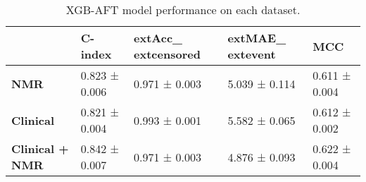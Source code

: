 \begin{table}
\caption{XGB-AFT model performance on each dataset.}
\label{tab:results_ex2}
\begin{tabular}{lllll}
\toprule
 & C-index & 	ext{Acc}_{	ext{censored}} & 	ext{MAE}_{	ext{event}} & MCC \\
\midrule
\textbf{NMR} & 0.823 ± 0.006 & 0.971 ±                 0.003 & 5.039 ± 0.114 & 0.611 ± 0.004 \\
\textbf{Clinical} & 0.821 ± 0.004 & 0.993 ±                 0.001 & 5.582 ± 0.065 & 0.612 ± 0.002 \\
\textbf{Clinical + NMR} & 0.842 ± 0.007 & 0.971 ±                 0.003 & 4.876 ± 0.093 & 0.622 ± 0.004 \\
\bottomrule
\end{tabular}
\end{table}
